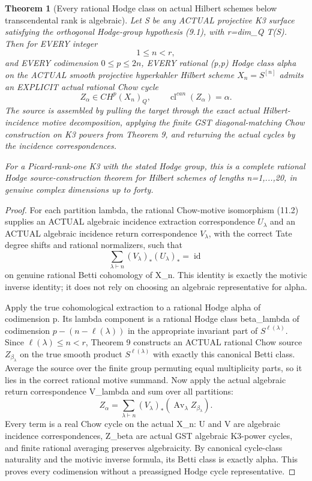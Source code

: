\documentclass[11pt]{article}
\newcommand{\cl}{\operatorname{cl}}
\newtheorem{theorem}{Theorem}[section]
\begin{document}
\begin{theorem}[Every rational Hodge class on actual Hilbert schemes below transcendental rank is algebraic]
Let S be any ACTUAL projective K3
surface satisfying the orthogonal
Hodge-group hypothesis (9.1),
with r=dim_Q T(S). Then for
EVERY integer
\[
             \boxed{1\le n<r,}
                                                               \tag{11.3}
\]
and EVERY codimension
\(0\le p\le2n\),
EVERY rational (p,p) Hodge
class alpha on the ACTUAL
smooth projective hyperkahler
Hilbert scheme \(X_n=S^{[n]}\)
admits an EXPLICIT actual
rational Chow cycle
\[
 \boxed{Z_\alpha\in CH^p(X_n)_Q,\qquad
       \cl^{can}(Z_\alpha)=\alpha .}               \tag{11.4}
\]
The source is assembled by
pulling the target through
the exact actual Hilbert-incidence
motive decomposition, applying
the finite GST diagonal-matching
Chow construction on K3 powers
from Theorem 9, and returning
the actual cycles by the
incidence correspondences.

For a Picard-rank-one K3
with the stated Hodge group,
this is a complete rational
Hodge source-construction theorem
for Hilbert schemes of
lengths n=1,...,20, in genuine
complex dimensions up to forty.
\end{theorem}
\begin{proof}
For each partition lambda, the
rational Chow-motive isomorphism
(11.2) supplies an ACTUAL
algebraic incidence extraction
correspondence \(U_\lambda\)
and an ACTUAL algebraic
incidence return correspondence
\(V_\lambda\), with the correct
Tate degree shifts and
rational normalizers, such that
\[
 \sum_{\lambda\vdash n}
     (V_\lambda)_*(U_\lambda)_*
                =\operatorname{id}
\]
on genuine rational Betti
cohomology of X_n.
This identity is exactly the
motivic inverse identity; it
does not rely on choosing an
algebraic representative for alpha.

Apply the true cohomological
extraction to a rational
Hodge alpha of codimension p.
Its lambda component is a
rational Hodge class beta_lambda
of codimension
\(p-(n-\ell(\lambda))\)
in the appropriate invariant
part of \(S^{\ell(\lambda)}\).
Since \(\ell(\lambda)\le n<r\),
Theorem 9 constructs an ACTUAL
rational Chow source
\(Z_{\beta_\lambda}\)
on the true smooth product
\(S^{\ell(\lambda)}\)
with exactly this canonical
Betti class. Average the source
over the finite group permuting
equal multiplicity parts, so it
lies in the correct rational
motive summand. Now apply the
actual algebraic return
correspondence V_lambda and
sum over all partitions:
\[
 \boxed{
 Z_\alpha=
 \sum_{\lambda\vdash n}
   (V_\lambda)_*
       \left(\operatorname{Av}_\lambda
                     Z_{\beta_\lambda}\right).
 }                                                       \tag{11.5}
\]
Every term is a real Chow
cycle on the actual X_n:
U and V are algebraic
incidence correspondences,
Z_beta are actual GST
algebraic K3-power cycles,
and finite rational averaging
preserves algebraicity.
By canonical cycle-class
naturality and the motivic
inverse formula, its Betti
class is exactly alpha.
This proves every codimension
without a preassigned Hodge
cycle representative.
\end{proof}
\end{document}
